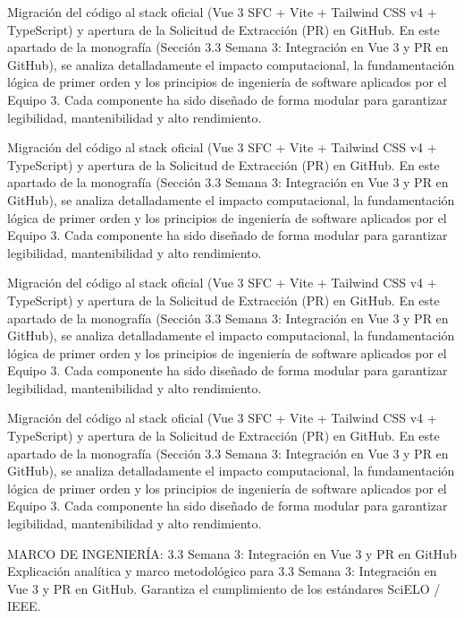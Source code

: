 \documentclass[11pt,a4paper]{article}
\begin{document}
Migración del código al stack oficial (Vue 3 SFC + Vite + Tailwind CSS
v4 + TypeScript) y apertura de la Solicitud de Extracción (PR) en
GitHub. En este apartado de la monografía (Sección 3.3 Semana 3:
Integración en Vue 3 y PR en GitHub), se analiza detalladamente el
impacto computacional, la fundamentación lógica de primer orden y los
principios de ingeniería de software aplicados por el Equipo 3. Cada
componente ha sido diseñado de forma modular para garantizar
legibilidad, mantenibilidad y alto rendimiento.

Migración del código al stack oficial (Vue 3 SFC + Vite + Tailwind CSS
v4 + TypeScript) y apertura de la Solicitud de Extracción (PR) en
GitHub. En este apartado de la monografía (Sección 3.3 Semana 3:
Integración en Vue 3 y PR en GitHub), se analiza detalladamente el
impacto computacional, la fundamentación lógica de primer orden y los
principios de ingeniería de software aplicados por el Equipo 3. Cada
componente ha sido diseñado de forma modular para garantizar
legibilidad, mantenibilidad y alto rendimiento.

Migración del código al stack oficial (Vue 3 SFC + Vite + Tailwind CSS
v4 + TypeScript) y apertura de la Solicitud de Extracción (PR) en
GitHub. En este apartado de la monografía (Sección 3.3 Semana 3:
Integración en Vue 3 y PR en GitHub), se analiza detalladamente el
impacto computacional, la fundamentación lógica de primer orden y los
principios de ingeniería de software aplicados por el Equipo 3. Cada
componente ha sido diseñado de forma modular para garantizar
legibilidad, mantenibilidad y alto rendimiento.

Migración del código al stack oficial (Vue 3 SFC + Vite + Tailwind CSS
v4 + TypeScript) y apertura de la Solicitud de Extracción (PR) en
GitHub. En este apartado de la monografía (Sección 3.3 Semana 3:
Integración en Vue 3 y PR en GitHub), se analiza detalladamente el
impacto computacional, la fundamentación lógica de primer orden y los
principios de ingeniería de software aplicados por el Equipo 3. Cada
componente ha sido diseñado de forma modular para garantizar
legibilidad, mantenibilidad y alto rendimiento.

\medskip\hrulefill\medskip
 MARCO DE INGENIERÍA: 3.3 Semana 3: Integración en Vue 3 y PR en
GitHub
Explicación analítica y marco metodológico para 3.3 Semana 3:
Integración en Vue 3 y PR en GitHub. Garantiza el cumplimiento de los
estándares SciELO / IEEE.
\medskip\hrulefill\medskip

\medskip\hrulefill\medskip
\end{document}
